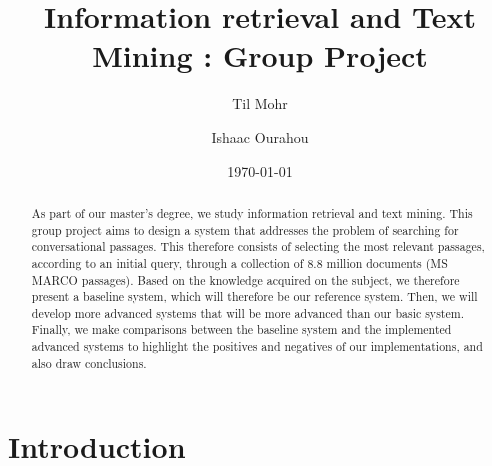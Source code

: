 \documentclass[sigconf]{acmart}
\begin{document}
\title{Information retrieval and Text Mining : Group Project}

\author{Til Mohr}
\affiliation{}

\author{Ishaac Ourahou}
\affiliation{}

\date{\today}



\begin{abstract}
As part of our master's degree, we study information retrieval and text mining. This group project aims to design a system that addresses the problem of searching for conversational passages. This therefore consists of selecting the most relevant passages, according to an initial query, through a collection of 8.8 million documents (MS MARCO passages). Based on the knowledge acquired on the subject, we therefore present a baseline system, which will therefore be our reference system. Then, we will develop more advanced systems that will be more advanced than our basic system. Finally, we make comparisons between the baseline system and the implemented advanced systems to highlight the positives and negatives of our implementations, and also draw conclusions.
\end{abstract}


\renewcommand\footnotetextcopyrightpermission[1]{}
\pagestyle{plain}

\maketitle


\section{Introduction}
\end{document}
